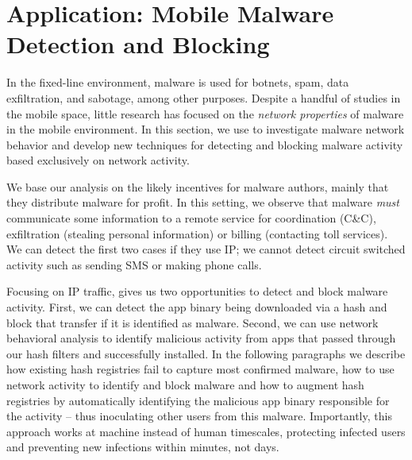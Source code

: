 \section{Application: Mobile Malware \\
Detection and Blocking}
\label{sec:malware}

%
%
%


In the fixed-line environment, malware is used for botnets, spam, data exfiltration, and sabotage, among other 
purposes. Despite a handful of studies in the mobile space, little research has focused on the \emph{network 
properties} of malware in the mobile environment. In this section, we use \meddle to investigate malware network 
behavior and develop new techniques for detecting and blocking malware activity based exclusively on network 
activity.

 We base our analysis on the likely incentives for malware authors, mainly 
that they distribute malware for profit. In this setting, we observe that malware \emph{must} communicate some information 
to a remote service for coordination (\eg C\&C), exfiltration (stealing personal information) or billing (contacting toll services). 
We can detect the first two cases if they use IP; we cannot detect circuit switched activity such as sending SMS or making 
phone calls.

Focusing on IP traffic, \meddle gives us two opportunities to detect and block malware activity. First, we can detect 
the app binary being downloaded via a hash and block that transfer if it is identified as malware. Second, we can use network 
behavioral analysis to identify malicious activity from apps that passed through our hash filters and successfully installed. 
In the following paragraphs we describe how existing hash registries fail to capture most confirmed malware, how to 
use network activity to identify and block malware and how to augment hash registries by automatically identifying the 
malicious app binary responsible for the activity -- thus inoculating other users from this malware. Importantly, 
this approach works at machine instead of human timescales, protecting infected users and preventing new infections 
within minutes, not days.

